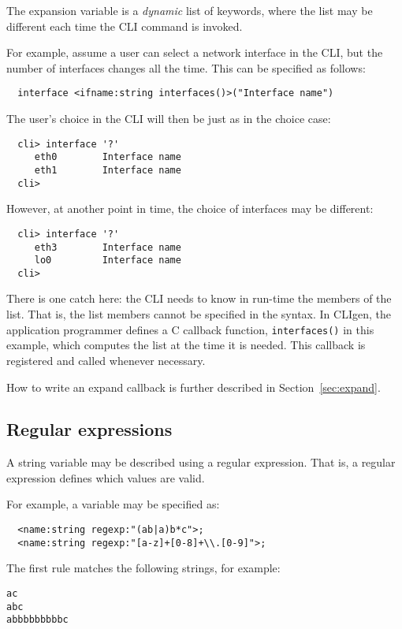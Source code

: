 \documentclass[a4paper, 10pt] {article}
\begin{document}
The expansion variable is a \emph{dynamic} list of keywords, where the
list may be different each time the CLI command is invoked.

For example, assume a user can select a network interface in the CLI,
but the number of interfaces changes all the time. This can be
specified as follows:

\begin{verbatim}
  interface <ifname:string interfaces()>("Interface name")
\end{verbatim}
The user's choice in the CLI will then be just as in the choice case:
\begin{verbatim}
  cli> interface '?'
     eth0        Interface name
     eth1        Interface name
  cli> 
\end{verbatim}

However, at another point in time, the choice of interfaces may be different:
\begin{verbatim}
  cli> interface '?'
     eth3        Interface name
     lo0         Interface name
  cli> 
\end{verbatim}

There is one catch here: the CLI needs to know in run-time the members
of the list. That is, the list members cannot be specified in the
syntax.  In CLIgen, the application programmer defines a C callback
function, {\tt interfaces()} in this example, which computes the list
at the time it is needed. This callback is registered and called
whenever necessary.

How to write an expand callback is further described in
Section~\ref{sec:expand}.

\subsection{Regular expressions}

A string variable may be described using a regular expression. That
is, a regular expression defines which values are valid. 

For example, a variable may be specified as:
\begin{verbatim}
  <name:string regexp:"(ab|a)b*c">;
  <name:string regexp:"[a-z]+[0-8]+\\.[0-9]">;
\end{verbatim}
The first rule matches the following strings, for example:
\begin{verbatim}
ac
abc
abbbbbbbbbc
\end{verbatim}
\end{document}
